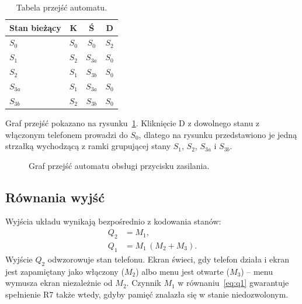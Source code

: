 \begin{table}[H]
\centering
\caption{Tabela przejść automatu.}
\label{tab:przejscia}
\begin{tabular}{l|ccc}
\toprule
Stan bieżący & K & Ś & D \\
\midrule
$S_0$    & $S_0$    & $S_0$    & $S_2$ \\
$S_1$    & $S_2$    & $S_{3a}$ & $S_0$ \\
$S_2$    & $S_1$    & $S_{3b}$ & $S_0$ \\
$S_{3a}$ & $S_1$    & $S_{3a}$ & $S_0$ \\
$S_{3b}$ & $S_2$    & $S_{3b}$ & $S_0$ \\
\bottomrule
\end{tabular}
\end{table}

Graf przejść pokazano na rysunku~\ref{fig:automat}. Kliknięcie D
z dowolnego stanu z włączonym telefonem prowadzi do $S_0$, dlatego na
rysunku przedstawiono je jedną strzałką wychodzącą z ramki grupującej
stany $S_1$, $S_2$, $S_{3a}$ i $S_{3b}$.

\begin{figure}[H]
\centering

\caption{Graf przejść automatu obsługi przycisku zasilania.}
\label{fig:automat}
\end{figure}

\subsection{Równania wyjść}
Wyjścia układu wynikają bezpośrednio z kodowania stanów:
\begin{align}
    Q_2 &= M_1, \label{eq:q2}\\
    Q_1 &= M_1\,(M_2 + M_3). \label{eq:q1}
\end{align}
Wyjście $Q_2$ odwzorowuje stan telefonu. Ekran świeci, gdy telefon
działa i ekran jest zapamiętany jako włączony ($M_2$) albo menu jest
otwarte ($M_3$) -- menu wymusza ekran niezależnie od $M_2$.
Czynnik $M_1$ w równaniu~\eqref{eq:q1} gwarantuje spełnienie R7 także
wtedy, gdyby pamięć znalazła się w stanie niedozwolonym.
